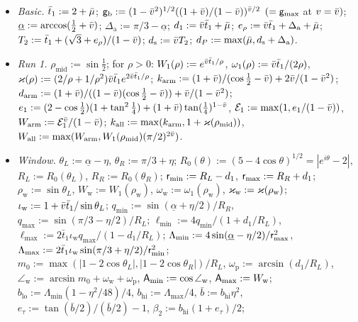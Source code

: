 \begin{definition}\label{def:tdconst}
{\small
\begin{itemize}\setlength\itemsep{2pt}
\item \emph{Basic.} $\bar t_1:=2+\bar\mu$; $\mathsf g_{\mathrm b}:=(1-\bar v^2)^{1/2}((1+\bar v)/(1-\bar v))^{\bar v/2}$ $(=\mathsf g_{\max}$ at $v=\bar v)$;
$\underline\alpha:=\arccos(\frac12+\bar v)$; $\Delta_{\mathrm a}:=\pi/3-\underline\alpha$; $d_1:=\bar v\bar t_1+\bar\mu$;
$e_\rho:=\bar v\bar t_1+\Delta_{\mathrm a}+\bar\mu$; $T_2:=\bar t_1+(\sqrt3+e_\rho)/(1-\bar v)$; $d_{\mathrm s}:=\bar v T_2$;
$d_P:=\max(\bar\mu,d_{\mathrm s}+\Delta_{\mathrm a})$.
\item \emph{Run 1.} $\rho_{\mathrm{mid}}:=\sin\frac12$; for $\rho>0$: $W_1(\rho):=e^{\bar v\bar t_1/\rho}$, $\omega_1(\rho):=\bar v\bar t_1/(2\rho)$,
$\varkappa(\rho):=(2/\rho+1/\rho^2)\bar v\bar t_1e^{2\bar v\bar t_1/\rho}$; $k_{\mathrm{arm}}:=(1+\bar v)/(\cos\frac12-\bar v)+2\bar v/(1-\bar v^2)$;
$d_{\mathrm{arm}}:=(1+\bar v)/((1-\bar v)(\cos\frac12-\bar v))+\bar v/(1-\bar v^2)$;
$e_1:=(2-\cos\frac12)(1+\tan^2\frac14)+(1+\bar v)\tan(\frac14)^{1-\bar v}$, $\mathcal E_1:=\max(1,e_1/(1-\bar v))$,
$W_{\mathrm{arm}}:=\mathcal E_1^{\bar v}/(1-\bar v)$; $k_{\mathrm{all}}:=\max(k_{\mathrm{arm}},1+\varkappa(\rho_{\mathrm{mid}}))$,
$W_{\mathrm{all}}:=\max(W_{\mathrm{arm}},W_1(\rho_{\mathrm{mid}})(\pi/2)^{2\bar v})$.
\item \emph{Window.} $\theta_L:=\underline\alpha-\eta$, $\theta_R:=\pi/3+\eta$; $R_0(\theta):=(5-4\cos\theta)^{1/2}=|e^{i\theta}-2|$,
$R_L:=R_0(\theta_L)$, $R_R:=R_0(\theta_R)$; $\mathsf r_{\min}:=R_L-d_1$, $\mathsf r_{\max}:=R_R+d_1$; $\rho_{\mathrm w}:=\sin\theta_L$,
$W_{\mathrm w}:=W_1(\rho_{\mathrm w})$, $\omega_{\mathrm w}:=\omega_1(\rho_{\mathrm w})$, $\varkappa_{\mathrm w}:=\varkappa(\rho_{\mathrm w})$;
$\iota_{\mathrm w}:=1+\bar v\bar t_1/\sin\theta_L$; $q_{\min}:=\sin(\underline\alpha+\eta/2)/R_R$, $q_{\max}:=\sin(\pi/3-\eta/2)/R_L$;
$\ell_{\min}:=4q_{\min}/(1+d_1/R_L)$, $\ell_{\max}:=2\bar t_1\iota_{\mathrm w}q_{\max}/(1-d_1/R_L)$;
$\Lambda_{\min}:=4\sin(\underline\alpha-\eta/2)/\mathsf r_{\max}^2$, $\Lambda_{\max}:=2\bar t_1\iota_{\mathrm w}\sin(\pi/3+\eta/2)/\mathsf r_{\min}^2$;
$m_0:=\max(|1-2\cos\theta_L|,|1-2\cos\theta_R|)/R_L$, $\omega_{\mathrm p}:=\arcsin(d_1/R_L)$,
$\angle_{\mathrm w}:=\arcsin m_0+\omega_{\mathrm w}+\omega_{\mathrm p}$, $\mathsf A_{\min}:=\cos\angle_{\mathrm w}$, $\mathsf A_{\max}:=W_{\mathrm w}$;
$b_{\mathrm{lo}}:=\Lambda_{\min}(1-\eta^2/48)/4$, $b_{\mathrm{hi}}:=\Lambda_{\max}/4$, $\bar b:=b_{\mathrm{hi}}\eta^2$,
$e_\tau:=\tan(\bar b/2)/(\bar b/2)-1$, $\beta_2:=b_{\mathrm{hi}}(1+e_\tau)/2$;

\end{itemize}}
\end{definition}

